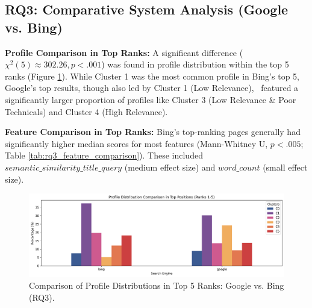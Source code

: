 \documentclass[a4paper,fleqn]{cas-sc}
\begin{document}
\subsection{RQ3: Comparative System Analysis (Google vs. Bing)}
\label{subsec:results_rq3}
\textbf{Profile Comparison in Top Ranks:} A significant difference ($\chi^2(5) \approx 302.26, p < .001$) was found in profile distribution within the top 5 ranks (Figure \ref{fig:rq3_profile_comparison}). While Cluster 1 was the most common profile in Bing's top 5, Google's top results, though also led by Cluster 1 (Low Relevance), 
featured a significantly larger proportion of profiles like Cluster 3 (Low Relevance \& Poor Technicals) and Cluster 4 (High Relevance).

\textbf{Feature Comparison in Top Ranks:} Bing's top-ranking pages generally had significantly higher median scores for most features (Mann-Whitney U, $p < .005$; Table \ref{tab:rq3_feature_comparison}). These included $semantic\_similarity\_title\_query$ (medium effect size) and $word\_count$ (small effect size).

\begin{figure}[htbp!]
\centering
\includegraphics[width=1\linewidth]{figs/rq3_profile_comparison.png}
\caption{Comparison of Profile Distributions in Top 5 Ranks: Google vs. Bing (RQ3).}
\label{fig:rq3_profile_comparison}
\end{figure}
\end{document}
